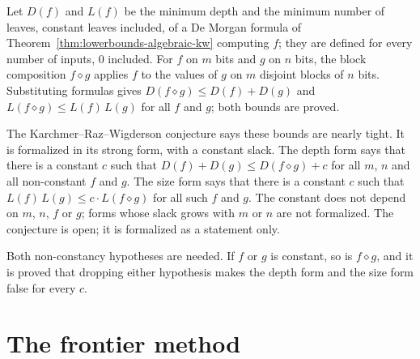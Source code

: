 \begin{definition}
  \label{def:lowerbounds-algebraic-krw}
  \leanok
  Let $D(f)$ and $L(f)$ be the minimum depth and the minimum number of leaves,
  constant leaves included, of a De Morgan formula of
  Theorem~\ref{thm:lowerbounds-algebraic-kw} computing $f$; they are defined
  for every number of inputs, $0$ included. For $f$ on $m$ bits and $g$ on $n$
  bits, the block composition $f \diamond g$ applies $f$ to the values of $g$
  on $m$ disjoint blocks of $n$ bits. Substituting formulas gives
  $D(f \diamond g) \le D(f) + D(g)$ and $L(f \diamond g) \le L(f)\,L(g)$ for
  all $f$ and $g$; both bounds are proved.

  The Karchmer--Raz--Wigderson conjecture says these bounds are nearly tight.
  It is formalized in its strong form, with a constant slack. The depth form
  says that there is a constant $c$ such that
  $D(f) + D(g) \le D(f \diamond g) + c$ for all $m$, $n$ and all non-constant
  $f$ and $g$. The size form says that there is a constant $c$ such that
  $L(f)\,L(g) \le c \cdot L(f \diamond g)$ for all such $f$ and $g$. The
  constant does not depend on $m$, $n$, $f$ or $g$; forms whose slack grows
  with $m$ or $n$ are not formalized. The conjecture is open; it is formalized
  as a statement only.

  Both non-constancy hypotheses are needed. If $f$ or $g$ is constant, so is
  $f \diamond g$, and it is proved that dropping either hypothesis makes the
  depth form and the size form false for every $c$.
\end{definition}

\section{The frontier method}
\label{sec:lowerbounds-frontier}

